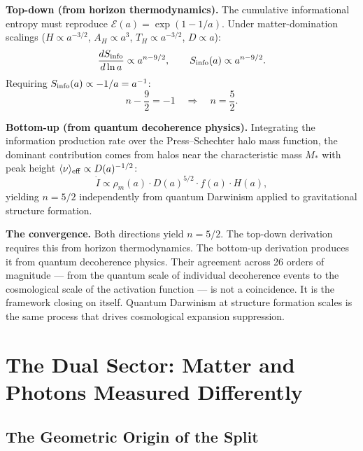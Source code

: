 \documentclass[12pt,a4paper]{article}
\begin{document}
\textbf{Top-down (from horizon thermodynamics).} The cumulative informational
entropy must reproduce $\mathcal{E}(a) = \exp(1-1/a)$. Under matter-domination
scalings ($H \propto a^{-3/2}$, $A_H \propto a^3$, $T_H \propto a^{-3/2}$,
$D \propto a$):
\begin{equation}
\frac{dS_{\rm info}}{d\ln a} \propto a^{n - 9/2},
\qquad
S_{\rm info}(a) \propto a^{n-9/2}.
\end{equation}
Requiring $S_{\rm info}(a) \propto -1/a = a^{-1}$:
\begin{equation}
n - \frac{9}{2} = -1 \quad\Longrightarrow\quad \boxed{n = \frac{5}{2}}.
\end{equation}

\textbf{Bottom-up (from quantum decoherence physics).} Integrating the
information production rate over the Press--Schechter halo mass function,
the dominant contribution comes from halos near the characteristic mass $M_*$
with peak height $\langle\nu\rangle_{\rm eff} \propto D(a)^{-1/2}$:
\begin{equation}
\dot{I} \propto \rho_m(a) \cdot D(a)^{5/2} \cdot f(a) \cdot H(a),
\end{equation}
yielding $n = 5/2$ independently from quantum Darwinism applied to gravitational
structure formation.

\begin{keybox}
\textbf{The convergence.} Both directions yield $n = 5/2$. The top-down
derivation requires this from horizon thermodynamics. The bottom-up derivation
produces it from quantum decoherence physics. Their agreement across 26 orders
of magnitude --- from the quantum scale of individual decoherence events to the
cosmological scale of the activation function --- is not a coincidence. It is
the framework closing on itself. Quantum Darwinism at structure formation scales
is the same process that drives cosmological expansion suppression.
\end{keybox}

\newpage

\section{The Dual Sector: Matter and Photons Measured Differently}
\label{sec:dualsector}

\subsection{The Geometric Origin of the Split}
\end{document}
